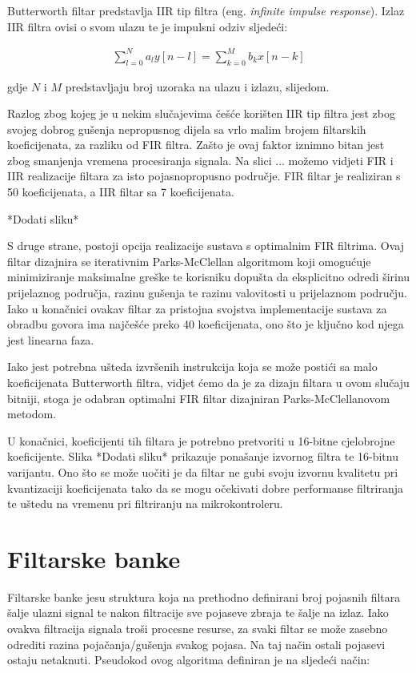 \documentclass[times, utf8, diplomski]{fer}
\begin{document}
Butterworth filtar predstavlja IIR tip filtra (eng. \textit{infinite impulse response}). Izlaz IIR filtra ovisi o svom ulazu te je impulsni odziv sljedeći:

\begin{equation}
\begin{aligned}
\sum_{l=0}^{N}a_{l}y[n-l] = \sum_{k=0}^{M}b_{k}x[n-k]
\end{aligned}
\end{equation}


gdje $N$ i $M$ predstavljaju broj uzoraka na ulazu i izlazu, slijedom.

Razlog zbog kojeg je u nekim slučajevima češće korišten IIR tip filtra jest zbog svojeg dobrog gušenja nepropusnog dijela sa vrlo malim brojem filtarskih koeficijenata, za razliku od FIR filtra. Zašto je ovaj faktor iznimno bitan jest zbog smanjenja vremena procesiranja signala. Na slici ... možemo vidjeti FIR i IIR realizacije filtara za isto pojasnopropusno područje. FIR filtar je realiziran s 50 koeficijenata, a IIR filtar sa 7 koeficijenata. 

*Dodati sliku*


S druge strane, postoji opcija realizacije sustava s optimalnim FIR filtrima. Ovaj filtar dizajnira se iterativnim Parks-McClellan algoritmom koji omogućuje minimiziranje maksimalne greške te korisniku dopušta da eksplicitno odredi širinu prijelaznog područja, razinu gušenja te razinu valovitosti u prijelaznom području. Iako u konačnici ovakav filtar za pristojna svojstva implementacije sustava za obradbu govora ima najčešće preko 40 koeficijenata, ono što je ključno kod njega jest linearna faza.

Iako jest potrebna ušteda izvršenih instrukcija koja se može postići sa malo koeficijenata Butterworth filtra, vidjet ćemo da je za dizajn filtara u ovom slučaju bitniji, stoga je odabran optimalni FIR filtar dizajniran Parks-McClellanovom metodom.

U konačnici, koeficijenti tih filtara je potrebno pretvoriti u 16-bitne cjelobrojne koeficijente. Slika *Dodati sliku* prikazuje ponašanje izvornog filtra te 16-bitnu varijantu. Ono što se može uočiti je da filtar ne gubi svoju izvornu kvalitetu pri kvantizaciji koeficijenata tako da se mogu očekivati dobre performanse filtriranja te uštedu na vremenu pri filtriranju na mikrokontroleru. 

\section{Filtarske banke}
Filtarske banke jesu struktura koja na prethodno definirani broj pojasnih filtara šalje ulazni signal te nakon filtracije sve pojaseve zbraja te šalje na izlaz. Iako ovakva filtracija signala troši procesne resurse, za svaki filtar se može zasebno odrediti razina pojačanja/gušenja svakog pojasa. Na taj način ostali pojasevi ostaju netaknuti. Pseudokod ovog algoritma definiran je na sljedeći način:
\end{document}
